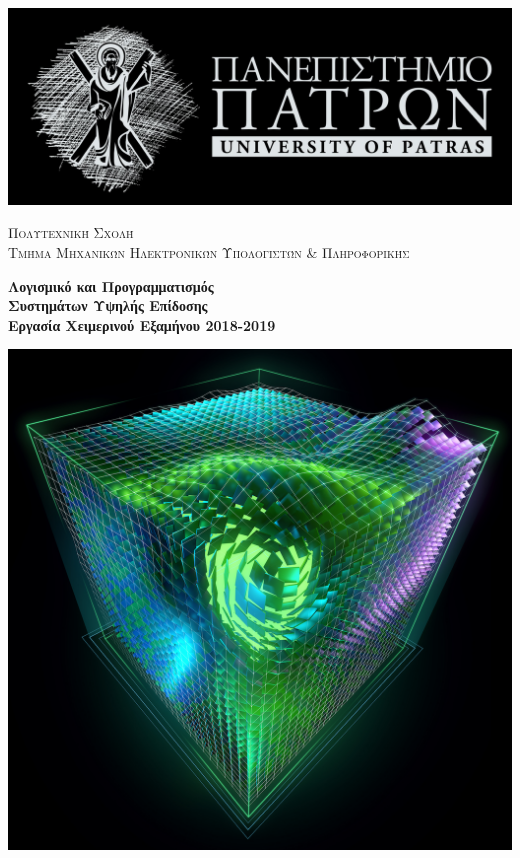 \color{white}
\begin{center}
    \thispagestyle{empty}
    \includegraphics[scale=0.9]{logo-neg.jpg}
    \pagecolor{black}\afterpage{\restorepagecolor}
    
    \vspace{0.1cm}
    
    \textsc{\large Πολυτεχνική Σχολή \\ Τμήμα Μηχανικών Ηλεκτρονικών Υπολογιστών \& Πληροφορικής}
    
    \vspace{0.75cm}
    
    {\huge \noindent\textbf{Λογισμικό και Προγραμματισμός\\Συστημάτων Υψηλής Επίδοσης}
    \vspace{0.1cm}
\\ {\large \textbf{Εργασία Χειμερινού Εξαμήνου 2018-2019}}}

\vspace{1cm}
    
    \includegraphics[scale=0.25]{./images/CUDA_Cube_1K.jpg}


\end{center}
